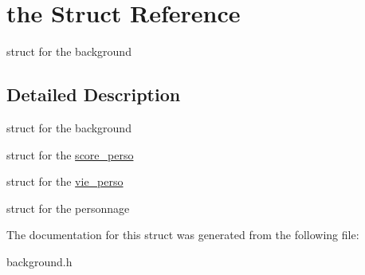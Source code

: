 \hypertarget{structthe}{}\section{the Struct Reference}
\label{structthe}


struct for the background  




\subsection{Detailed Description}
struct for the background 

struct for the \hyperlink{structscore__perso}{score\+\_\+perso}

struct for the \hyperlink{structvie__perso}{vie\+\_\+perso}

struct for the personnage 

The documentation for this struct was generated from the following file\+:\begin{DoxyCompactItemize}
\item 
background.\+h\end{DoxyCompactItemize}
